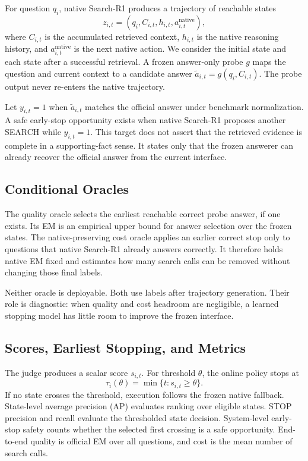 \documentclass[11pt,a4paper]{article}
\begin{document}
For question $q_i$, native Search-R1 produces a trajectory of reachable states
\begin{equation}
  z_{i,t}=(q_i,C_{i,t},h_{i,t},a^{\mathrm{native}}_{i,t}),
\end{equation}
where $C_{i,t}$ is the accumulated retrieved context, $h_{i,t}$ is the native reasoning history, and $a^{\mathrm{native}}_{i,t}$ is the next native action. We consider the initial state and each state after a successful retrieval. A frozen answer-only probe $g$ maps the question and current context to a candidate answer $\tilde a_{i,t}=g(q_i,C_{i,t})$. The probe output never re-enters the native trajectory.

Let $y_{i,t}=1$ when $\tilde a_{i,t}$ matches the official answer under benchmark normalization. A safe early-stop opportunity exists when native Search-R1 proposes another SEARCH while $y_{i,t}=1$. This target does not assert that the retrieved evidence is complete in a supporting-fact sense. It states only that the frozen answerer can already recover the official answer from the current interface.

\subsection{Conditional Oracles}

The quality oracle selects the earliest reachable correct probe answer, if one exists. Its EM is an empirical upper bound for answer selection over the frozen states. The native-preserving cost oracle applies an earlier correct stop only to questions that native Search-R1 already answers correctly. It therefore holds native EM fixed and estimates how many search calls can be removed without changing those final labels.

Neither oracle is deployable. Both use labels after trajectory generation. Their role is diagnostic: when quality and cost headroom are negligible, a learned stopping model has little room to improve the frozen interface.

\subsection{Scores, Earliest Stopping, and Metrics}

The judge produces a scalar score $s_{i,t}$. For threshold $\theta$, the online policy stops at
\begin{equation}
  \tau_i(\theta)=\min\{t:s_{i,t}\geq\theta\}.
\end{equation}
If no state crosses the threshold, execution follows the frozen native fallback. State-level average precision (AP) evaluates ranking over eligible states. STOP precision and recall evaluate the thresholded state decision. System-level early-stop safety counts whether the selected first crossing is a safe opportunity. End-to-end quality is official EM over all questions, and cost is the mean number of search calls.
\end{document}
